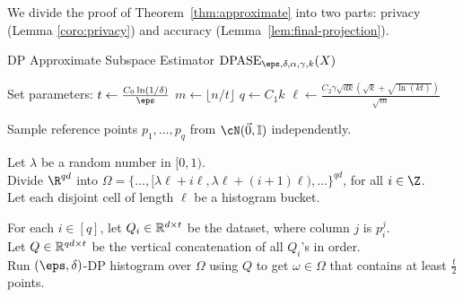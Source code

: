 We divide the proof of Theorem~\ref{thm:approximate}
into two parts: privacy (Lemma \ref{coro:privacy}) and
accuracy (Lemma~\ref{lem:final-projection}).

\begin{algorithm}[h!] 
\caption{\label{alg:approximate}DP Approximate Subspace Estimator
    $\DPASE_{\eps, \delta, \alpha, \gamma, k}(X)$}
\vspace{5pt}

Set parameters:
    $t \gets \tfrac{C_0\ln(1/\delta)}{\eps}$ \qquad
    $m \gets \lfloor n/t \rfloor$ \qquad $q \gets C_1 k$
    \qquad $\ell \gets \tfrac{C_2\gamma\sqrt{dk}(\sqrt{k}+\sqrt{\ln(kt)})}{\sqrt{m}}$
\vspace{5pt}

Sample reference points $p_1,\dots,p_q$ from $\cN(\vec{0},\id)$ independently.
\vspace{5pt}

\vspace{5pt}

Let $\lambda$ be a random number in $[0,1)$.\\
Divide $\R^{qd}$ into $\Omega =
    \{\dots,[\lambda\ell+i\ell,\lambda\ell+(i+1)\ell),\dots\}^{qd}$,
    for all $i \in \Z$.\\
Let each disjoint cell of length $\ell$ be a histogram bucket.
\vspace{5pt}

For each $i \in [q]$, let $Q_i \in \mathbb{R}^{d \times t}$ be the
    dataset, where column $j$ is $p_i^j$.\\
Let $Q \in \mathbb{R}^{qd \times t}$ be the vertical concatenation
    of all $Q_i$'s in order.\\
Run $(\eps,\delta)$-DP histogram over $\Omega$ using $Q$
    to get $\omega \in \Omega$ that contains at least $\tfrac{t}{2}$ points.\\
\vspace{5pt}


\end{algorithm}
